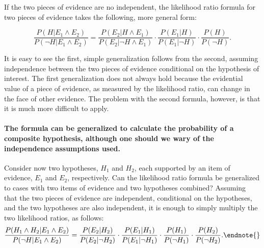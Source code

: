 \documentclass[10pt]{article}
\begin{document}
 If the two pieces of evidence are no independent, 
the likelihood ratio formula for two pieces of evidence 
takes the following, more general 
form:

	\[ \frac{P(H|E_1 \land E_2)}{P(\neg H | E_1 \land E_2)} = 
	\frac{P(E_2 | H \land E_1)}{P(E_2| \neg H \land E_1)}
	\cdot 
	\frac{P(E_1 | H)}{P(E_1| \neg H)}
	\cdot 
	\frac{P(H)}{P(\neg H)}.\]

\noindent It is easy to see the first, simple generalization follows from the second, assuming 
independence between the two pieces of evidence conditional on the hypothesis of interest. 
The first generalization does not always hold because 
the evidential value of a piece of evidence, as measured by the likelihood ratio, 
can change in the face of other evidence. The problem with the second formula, however, is that it 
is much more difficult to apply.











\paragraph{The formula can be generalized to calculate the probability of a composite hypothesis, although one should we wary 
of the independence assumptions used.} 
Consider now two hypotheses, $H_1$ and $H_2$, each supported by an item of 
evidence, $E_1$ and $E_2$, respectively.  Can the likelihood ratio formula be generalized to cases with 
two items of evidence and two hypotheses combined? Assuming that the two pieces of evidence are independent, conditional on the hypotheses, 
and the two hypotheses are also independent, 
it is enough to simply multiply the two likelihood ratios, as follows:
%
\[ \frac{P(H_1\wedge H_2|E_1 \land E_2)}{P(\neg H | E_1 \land E_2)} = 
	\frac{P(E_2 | H_2)}{P(E_2| \neg H_2)}
	\cdot 
	\frac{P(E_1 | H_1)}{P(E_1| \neg H_1)}
	\cdot 
	\frac{P(H_1)}{P(\neg H_1)}\cdot \frac{P(H_2)}{P(\neg H_2)}.\endnote{}\]
%
\end{document}
